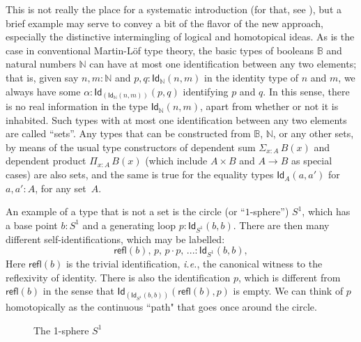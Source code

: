\documentclass[11pt]{article}
\newcommand{\B}{\ensuremath{\mathbb{B}}}
\newcommand{\N}{\ensuremath{\mathbb{N}}}
\newcommand{\Id}{\mathsf{Id}}
\newcommand{\id}[1]{\Id_{#1}}
\newcommand{\refl}{\mathsf{refl}}
\theoremstyle{remark}
\theoremstyle{definition}
\begin{document}
This is not really the place for a systematic introduction (for that, see \cite{HoTTbook}),  
but a brief example may serve to convey a bit of the flavor of the new approach, especially the
distinctive intermingling of logical and homotopical ideas.  As is the case in conventional Martin-L\"of type theory,
the basic types of booleans $\B$ and natural numbers $\N$ can have at most one identification between any two elements;
that is, given say $n, m : \N$ and $p,q: \id{\N}(n,m)$ in the identity type of $n$ and $m$, we always have some
$\alpha:\id{\left(\id{\N}(n,m)\right)}(p,q)$ identifying $p$ and $q$.  In this sense, there is no real information in
the type $\id{\N}(n,m)$, apart from whether or not it is inhabited.  Such types with at most one identification between
any two elements are called ``sets''.  Any types that can be constructed from $\B$,
$\N$, or any other sets, by means of the usual type constructors of dependent sum $\Sigma_{x:A}\,B(x)$ and dependent
product $\Pi_{x:A}\,B(x)$ (which include $A\times B$ and $A\rightarrow B$ as special cases) are also sets, and the same
is true for the equality types $\id{A}(a,a')$ for $a,a':A$, for any set~$A$.

An example of a type that is not a set is the circle (or ``$1$-sphere'') $S^1$, which has a base point $b: S^1$ and a
generating loop $ p :\id{S^1}(b,b)$.  There are then many different self-identifications, which may be labelled:
$$\refl(b),\, p,\, p\cdot p,\, ... :\id{S^1}(b,b),$$ 
Here $\refl(b)$ is the trivial identification, \textit{i.e.}, the
canonical witness to the reflexivity of identity.  There is also the identification $p$, which is different from
$\refl(b)$ in the sense that $\id{\left(\id{S^1}(b,b)\right)}(\refl(b), p)$ is empty.  We can think of $p$ homotopically
as the continuous ``path" that goes once around the circle.

\begin{figure}\centering
\caption{The 1-sphere $S^1$}\label{fig:s1}
\end{figure}
\end{document}
